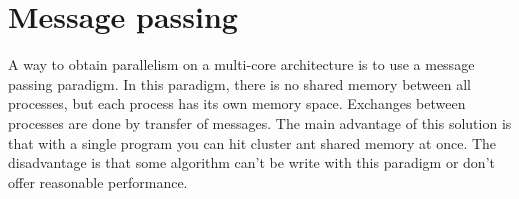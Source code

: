 \section{Message passing}
A way to obtain parallelism on a multi-core architecture is to use a message passing paradigm.
%
In this paradigm, there is no shared memory between all processes, but each process has its own memory space.
%
Exchanges between processes are done by transfer of messages.
%
The main advantage of this solution is that with a single program you can hit cluster ant shared memory at once.
%
The disadvantage is that some algorithm can't be write with this paradigm or don't offer reasonable performance.

